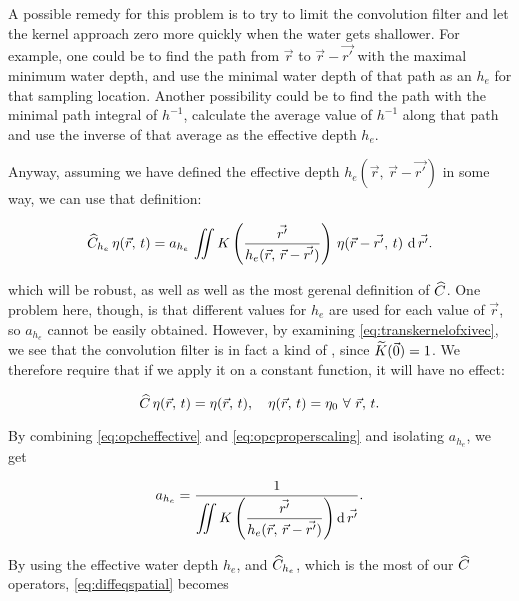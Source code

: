 A possible remedy for this problem is to try to limit the convolution filter and let the kernel approach zero more quickly when the water gets shallower. For example, one could be to find the path from $\vec{r}$ to $\vec{r}-\vec{r'}$ with the maximal minimum water depth, and use the minimal water depth of that path as an  $h_e$ for that sampling location. Another possibility could be to find the path with the minimal path integral of $h^{-1}$, calculate the average value of $h^{-1}$ along that path and use the inverse of that average as the effective depth $h_e$.


Anyway, assuming we have defined the effective depth \mbox{$h_e(\vec{r},\,\vec{r}-\vec{r'})$} in some way, we can use that definition:

\begin{equation} \label{eq:opcheffective}
\widehat{C}_{h_e}\,\eta(\vec{r},\,t) = a_{h_e}\,\int\!\!\!\!\int K\left(\frac{\vec{r'}}{h_e(\vec{r},\,\vec{r}-\vec{r'})}\right)\,\eta(\vec{r}-\vec{r'},\,t)\,\operatorname{d}\vec{r'}.
\end{equation}

which will be robust, as well as well as the most gerenal definition of $\widehat{C}$. One problem here, though, is that different values for $h_e$ are used for each value of $\vec{r}$, so $a_{h_e}$ cannot be easily obtained. However, by examining \eqref{eq:transkernelofxivec}, we see that the convolution filter is in fact a kind of , since $\widetilde{K}(\vec{0}) = 1$. We therefore require that if we apply it on a constant function, it will have no effect:

\begin{equation} \label{eq:opcproperscaling}
\widehat{C}\,\eta(\vec{r},\,t) = \eta(\vec{r},\,t),\quad\eta(\vec{r},\,t) = \eta_0\ \forall\ \vec{r},\,t.
\end{equation}

By combining \eqref{eq:opcheffective} and \eqref{eq:opcproperscaling} and isolating $a_{h_e}$, we get

\begin{equation} \label{eq:scalingheffective}
a_{h_e} = \frac{1}{\displaystyle\int\!\!\!\!\int K\left(\frac{\vec{r'}}{h_e(\vec{r},\,\vec{r}-\vec{r'})}\right) \operatorname{d}\vec{r'}}.
\end{equation}

By using the effective water depth $h_e$, and $\widehat{C}_{h_e}$, which is the most  of our $\widehat{C}$ operators, \eqref{eq:diffeqspatial} becomes

